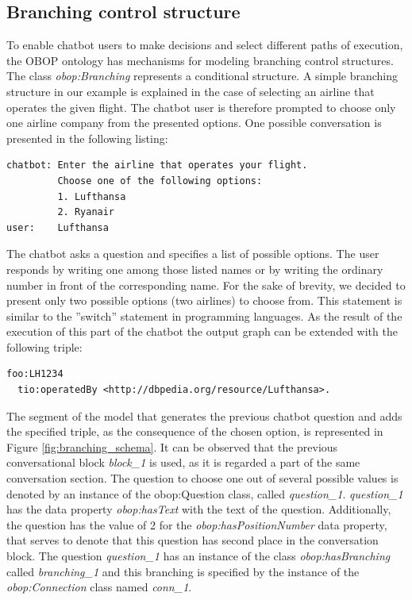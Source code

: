 \documentclass[runningheads]{llncs}
\begin{document}
\subsection{Branching control structure}
To enable chatbot users to make decisions and select different paths of execution, the OBOP ontology has mechanisms for modeling branching control structures. The class \textit{obop:Branching} represents a conditional structure. A simple branching structure in our example is explained in the case of selecting an airline that operates the given flight. The chatbot user is therefore prompted to choose only one airline company from the presented options.  
One possible conversation is presented in the following listing:
\begin{lstlisting}[basicstyle=\small,  xleftmargin=0.7cm ]
chatbot: Enter the airline that operates your flight.
         Choose one of the following options:
         1. Lufthansa
         2. Ryanair
user:    Lufthansa 
\end{lstlisting}
The chatbot asks a question and specifies a list of possible options. The user responds by writing one among those listed names or by writing the ordinary number in front of the corresponding name. For the sake of brevity, we decided to present only two possible options (two airlines) to choose from. This statement is similar to the ''switch'' statement in programming languages. As the result of the execution of this part of the chatbot the output graph can be extended with the following triple:
\begin{lstlisting}[basicstyle=\small,  xleftmargin=0.7cm ]
foo:LH1234
  tio:operatedBy <http://dbpedia.org/resource/Lufthansa>.
\end{lstlisting}
The segment of the model that generates the previous chatbot question and adds the specified triple, as the consequence of the chosen option, is represented in Figure \ref{fig:branching_schema}. It can be observed that the previous conversational block \textit{block\_1} is used, as it is regarded a part of the same conversation section. The question to choose one out of several possible values is denoted by an instance of the obop:Question class, called \textit{question\_1}. \textit{question\_1} has the data property \textit{obop:hasText} with the text of the question. Additionally, the question has the value of 2 for the \textit{obop:hasPositionNumber} data property, that serves to denote that this question has second place in the conversation block.         
The question \textit{question\_1} has an instance of the class \textit{obop:hasBranching} called \textit{branching\_1} and this branching is specified by the instance of the \textit{obop:Connection} class named \textit{conn\_1}.
\end{document}
